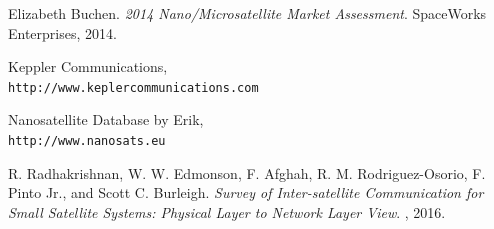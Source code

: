 \documentclass[12pt]{scrartcl}
\begin{document}
\begin{thebibliography}{4}
Elizabeth Buchen. 
\textit{2014 Nano/Microsatellite Market Assessment}. 
SpaceWorks Enterprises, 2014.
 
Keppler Communications,
\\\texttt{http://www.keplercommunications.com}

Nanosatellite Database by Erik,
\\\texttt{http://www.nanosats.eu}


R. Radhakrishnan, W. W. Edmonson, F. Afghah, R. M. Rodriguez-Osorio, F. Pinto
Jr., and Scott C. Burleigh. 
\textit{Survey of Inter-satellite Communication for Small Satellite Systems: Physical Layer to Network Layer View}. 
, 2016.
\end{thebibliography}
\end{document}
